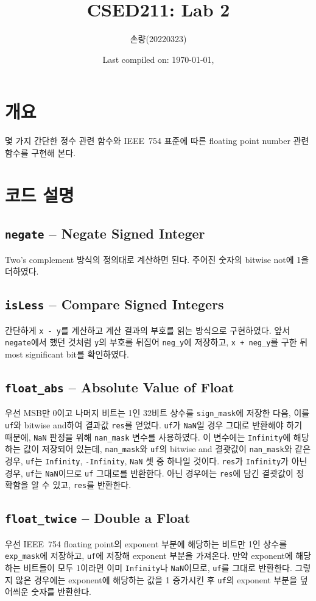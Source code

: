 \documentclass{scrartcl}
\title{CSED211: Lab 2}
\author{손량(20220323)}
\date{Last compiled on: \today, \currenttime}
\begin{document}
\maketitle

\section{개요}
몇 가지 간단한 정수 관련 함수와 IEEE~754 표준에 따른 floating point number 관련
함수를 구현해 본다.

\section{코드 설명}

\subsection{\texttt{negate} -- Negate Signed Integer}
Two's complement 방식의 정의대로 계산하면 된다. 주어진 숫자의 bitwise not에 1을
더하였다.

\subsection{\texttt{isLess} -- Compare Signed Integers}
간단하게 \texttt{x - y}를 계산하고 계산 결과의 부호를 읽는 방식으로 구현하였다.
앞서 \texttt{negate}에서 했던 것처럼 \texttt{y}의 부호를 뒤집어
\texttt{neg\_y}에 저장하고, \texttt{x + neg\_y}를 구한 뒤 most significant
bit를 확인하였다.

\subsection{\texttt{float\_abs} -- Absolute Value of Float}
우선 MSB만 0이고 나머지 비트는 1인 32비트 상수를 \texttt{sign\_mask}에 저장한
다음, 이를 \texttt{uf}와 bitwise and하여 결과값 \texttt{res}를 얻었다.
\texttt{uf}가 \texttt{NaN}일 경우 그대로 반환해야 하기 때문에, \texttt{NaN}
판정을 위해 \texttt{nan\_mask} 변수를 사용하였다. 이 변수에는
\texttt{Infinity}에 해당하는 값이 저장되어 있는데, \texttt{nan\_mask}와
\texttt{uf}의 bitwise and 결괏값이 \texttt{nan\_mask}와 같은 경우,
\texttt{uf}는 \texttt{Infinity}, \texttt{-Infinity}, \texttt{NaN} 셋 중 하나일
것이다. \texttt{res}가 \texttt{Infinity}가 아닌 경우, \texttt{uf}는
\texttt{NaN}이므로 \texttt{uf} 그대로를 반환한다. 아닌 경우에는 \texttt{res}에
담긴 결괏값이 정확함을 알 수 있고, \texttt{res}를 반환한다.

\subsection{\texttt{float\_twice} -- Double a Float}
우선 IEEE~754 floating point의 exponent 부분에 해당하는 비트만 1인 상수를
\texttt{exp\_mask}에 저장하고, \texttt{uf}에 저장해 exponent 부분을 가져온다.
만약 exponent에 해당하는 비트들이 모두 1이라면 이미 \texttt{Infinity}나
\texttt{NaN}이므로, \texttt{uf}를 그대로 반환한다. 그렇지 않은 경우에는
exponent에 해당하는 값을 1 증가시킨 후 \texttt{uf}의 exponent 부분을 덮어씌운
숫자를 반환한다.
\end{document}
